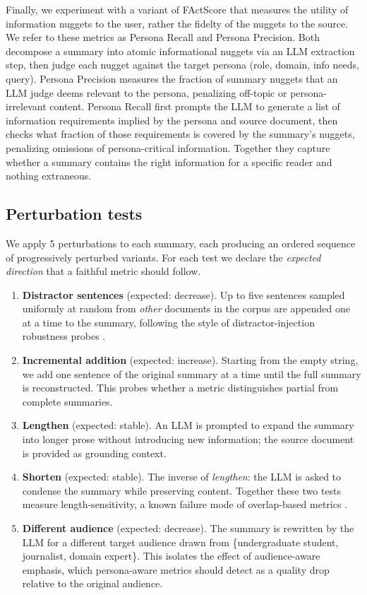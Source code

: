 Finally, we experiment with a variant of FActScore that measures the utility of information nuggets to the user, rather the fidelty of the nuggets to the source. We refer to these metrics as Persona Recall and Persona Precision.
 Both decompose a summary into atomic informational nuggets via an LLM extraction step, then judge each nugget against the target persona (role, domain, info needs, query). Persona Precision measures the fraction of summary nuggets that an LLM judge deems relevant to the persona, penalizing off-topic or persona-irrelevant content. Persona Recall first prompts the LLM to generate a list of information requirements implied by the persona and source document, then checks what fraction of those requirements is covered by the summary's nuggets, penalizing omissions of persona-critical information. Together they capture whether a summary contains the right information for a specific reader and nothing extraneous.


\subsection{Perturbation tests}
\label{sec:perturbations}

We apply 5 perturbations to each summary, each producing an ordered
sequence of progressively perturbed variants. For each test we declare
the \emph{expected direction} that a faithful metric should follow.

\begin{enumerate}
    \item \textbf{Distractor sentences} (expected: decrease). Up to five
    sentences sampled uniformly at random from \emph{other} documents in
    the corpus are appended one at a time to the summary, following the
    style of distractor-injection robustness probes
    \cite{kryscinski2019neural,gabriel2021goyfaithful}.
    \item \textbf{Incremental addition} (expected: increase). Starting
    from the empty string, we add one sentence of the original summary
    at a time until the full summary is reconstructed. This probes
    whether a metric distinguishes partial from complete summaries.
    \item \textbf{Lengthen} (expected: stable). An LLM is prompted to
    expand the summary into longer prose without introducing new
    information; the source document is provided as grounding context.
    \item \textbf{Shorten} (expected: stable). The inverse of
    \emph{lengthen}: the LLM is asked to condense the summary while
    preserving content. Together these two tests measure
    length-sensitivity, a known failure mode of overlap-based metrics
    \cite{sun2019compare}.
    \item \textbf{Different audience} (expected: decrease). The summary
    is rewritten by the LLM for a different target audience drawn from
    \{undergraduate student, journalist, domain expert\}. This isolates
    the effect of audience-aware emphasis, which persona-aware metrics
    should detect as a quality drop relative to the original audience.
\end{enumerate}

